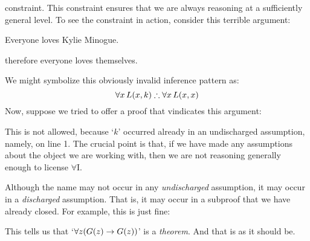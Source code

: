 constraint. This constraint ensures that we are always reasoning at a sufficiently general level.
To see the constraint in action, consider this terrible argument:
	\begin{earg}
		\item Everyone loves Kylie Minogue.
		\item[\texttherefore] therefore everyone loves themselves.
	\end{earg}
We might symbolize this obviously invalid inference pattern as:
$$\forall x\,\atom{L}{x,k} \therefore \forall x\,\atom{L}{x,x}$$
Now, suppose we tried to offer a proof that vindicates this argument:
\begin{fitchproof}
	\PR
	 
	 
\end{fitchproof}\noindent
This is not allowed, because `$k$' occurred already in an undischarged assumption, namely, on line 1. The crucial point is that, if we have made any assumptions about the object we are working with, then we are not reasoning generally enough to license $\forall$I.

Although the name may not occur in any \emph{undischarged} assumption, it may occur in a \emph{discharged} assumption. That is, it may occur in a subproof that we have already closed. For example, this is just fine:
\begin{fitchproof}
	\open
		\AS
	\close
\end{fitchproof}
This tells us that `$\forall z (\mathord{G}(z) \rightarrow \mathord{G}(z))$' is a \emph{theorem}. And that is as it should be.

